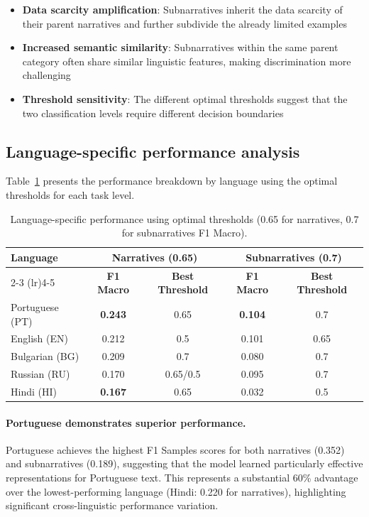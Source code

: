 \begin{itemize}
    \item \textbf{Data scarcity amplification}: Subnarratives inherit the data scarcity of their parent narratives and further subdivide the already limited examples
    \item \textbf{Increased semantic similarity}: Subnarratives within the same parent category often share similar linguistic features, making discrimination more challenging
    \item \textbf{Threshold sensitivity}: The different optimal thresholds suggest that the two classification levels require different decision boundaries
\end{itemize}

\subsection{Language-specific performance analysis}

Table~\ref{tab:language-performance} presents the performance breakdown by language using the optimal thresholds for each task level.

\begin{table}[htbp]
\centering
\caption{Language-specific performance using optimal thresholds (0.65 for narratives, 0.7 for subnarratives F1 Macro).}
\label{tab:language-performance}
\begin{tabular}{lcccc}
\toprule
\textbf{Language} & \multicolumn{2}{c}{\textbf{Narratives (0.65)}} & \multicolumn{2}{c}{\textbf{Subnarratives (0.7)}} \\
\cmidrule(lr){2-3} \cmidrule(lr){4-5}
& \textbf{F1 Macro} & \textbf{Best Threshold} & \textbf{F1 Macro} & \textbf{Best Threshold} \\
\midrule
Portuguese (PT) & \textbf{0.243} & 0.65 & \textbf{0.104} & 0.7 \\
English (EN) & 0.212 & 0.5 & 0.101 & 0.65 \\
Bulgarian (BG) & 0.209 & 0.7 & 0.080 & 0.7 \\
Russian (RU) & 0.170 & 0.65/0.5 & 0.095 & 0.7 \\
Hindi (HI) & \textbf{0.167} & 0.65 & 0.032 & 0.5 \\
\bottomrule
\end{tabular}
\end{table}

\paragraph{Portuguese demonstrates superior performance.} Portuguese achieves the highest F1 Samples scores for both narratives (0.352) and subnarratives (0.189), suggesting that the model learned particularly effective representations for Portuguese text. This represents a substantial 60\% advantage over the lowest-performing language (Hindi: 0.220 for narratives), highlighting significant cross-linguistic performance variation.

